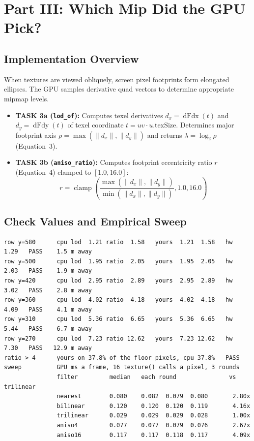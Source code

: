 \documentclass[10pt,a4paper]{article}
\begin{document}
\section{Part III: Which Mip Did the GPU Pick?}

\subsection{Implementation Overview}
When textures are viewed obliquely, screen pixel footprints form elongated ellipses. The GPU samples derivative quad vectors to determine appropriate mipmap levels.
\begin{itemize}
    \item \textbf{TASK 3a (\texttt{lod\_of}):} Computes texel derivatives $d_x = \operatorname{dFdx}(t)$ and $d_y = \operatorname{dFdy}(t)$ of texel coordinate $t = uv \cdot u.\text{texSize}$. Determines major footprint axis $\rho = \max(\|d_x\|, \|d_y\|)$ and returns $\lambda = \log_2 \rho$ (Equation~3).
    \item \textbf{TASK 3b (\texttt{aniso\_ratio}):} Computes footprint eccentricity ratio $r$ (Equation~4) clamped to $[1.0, 16.0]$:
    \[
    r = \operatorname{clamp}\left(\frac{\max(\|d_x\|, \|d_y\|)}{\min(\|d_x\|, \|d_y\|)}, 1.0, 16.0\right)
    \]
\end{itemize}

\subsection{Check Values and Empirical Sweep}
\begin{lstlisting}[caption={Automated Verification Output for Part III (make floor)}]
row y=580      cpu lod  1.21 ratio  1.58   yours  1.21  1.58   hw  1.29   PASS    1.5 m away
row y=500      cpu lod  1.95 ratio  2.05   yours  1.95  2.05   hw  2.03   PASS    1.9 m away
row y=420      cpu lod  2.95 ratio  2.89   yours  2.95  2.89   hw  3.02   PASS    2.8 m away
row y=360      cpu lod  4.02 ratio  4.18   yours  4.02  4.18   hw  4.09   PASS    4.1 m away
row y=310      cpu lod  5.36 ratio  6.65   yours  5.36  6.65   hw  5.44   PASS    6.7 m away
row y=270      cpu lod  7.23 ratio 12.62   yours  7.23 12.62   hw  7.30   PASS   12.9 m away
ratio > 4      yours on 37.8% of the floor pixels, cpu 37.8%   PASS
sweep          GPU ms a frame, 16 texture() calls a pixel, 3 rounds
               filter         median   each round               vs trilinear
               nearest        0.080    0.082  0.079  0.080       2.80x
               bilinear       0.120    0.120  0.120  0.119       4.16x
               trilinear      0.029    0.029  0.029  0.028       1.00x
               aniso4         0.077    0.077  0.079  0.076       2.67x
               aniso16        0.117    0.117  0.118  0.117       4.09x
\end{lstlisting}
\end{document}
